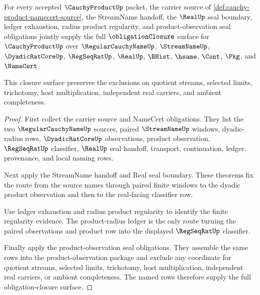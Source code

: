 \begin{theorem}
\label{thm:cauchy-product-obligation-closure}
For every accepted $\CauchyProductUp$ packet, the carrier source of
\autoref{def:cauchy-product-namecert-source}, the StreamName handoff, the
$\RealUp$ seal boundary, ledger exhaustion, radius product regularity, and
product-observation seal obligations jointly supply the full
$\obligationClosure$ surface for $\CauchyProductUp$ over
$\RegularCauchyNameUp$, $\StreamNameUp$, $\DyadicRatCoreUp$, $\RegSeqRatUp$,
$\RealUp$, $\BHist$, $\hsame$, $\Cont$, $\Pkg$, and $\NameCert$.

This closure surface preserves the exclusions on quotient streams, selected
limits, trichotomy, host multiplication, independent real carriers, and ambient
completeness.
\end{theorem}
\begin{proof}
First collect the carrier source and NameCert obligations. They list the two
$\RegularCauchyNameUp$ sources, paired $\StreamNameUp$ windows, dyadic-radius
rows, $\DyadicRatCoreUp$ observations, product observation, $\RegSeqRatUp$
classifier, $\RealUp$ seal handoff, transport, continuation, ledger,
provenance, and local naming rows.

Next apply the StreamName handoff and Real seal boundary. These theorems fix
the route from the source names through paired finite windows to the dyadic
product observation and then to the real-facing classifier row.

Use ledger exhaustion and radius product regularity to identify the finite
regularity evidence. The product-radius ledger is the only route turning the
paired observations and product row into the displayed $\RegSeqRatUp$
classifier.

Finally apply the product-observation seal obligations. They assemble the same
rows into the product-observation package and exclude any coordinate for
quotient streams, selected limits, trichotomy, host multiplication, independent
real carriers, or ambient completeness. The named rows therefore supply the
full obligation-closure surface.
\end{proof}

